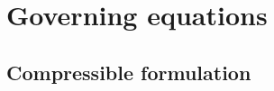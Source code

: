 \chapter{Governing equations}\label{sec:equations}

\def\Re{\mathrm{\bf Re}}
\def\Pr{\mathrm{\bf Pr}}
\def\Sc{\mathrm{\bf Sc}}
\def\Le{\mathrm{\bf Le}}
\def\Fr{\mathrm{\bf Fr}}
\def\Ro{\mathrm{\bf Ro}}
\def\Ma{\mathrm{\bf Ma}}
\def\Da{\mathrm{\bf Da}}
\def\Rg{\mathrm{\bf Rg}}

\section{Compressible formulation}

